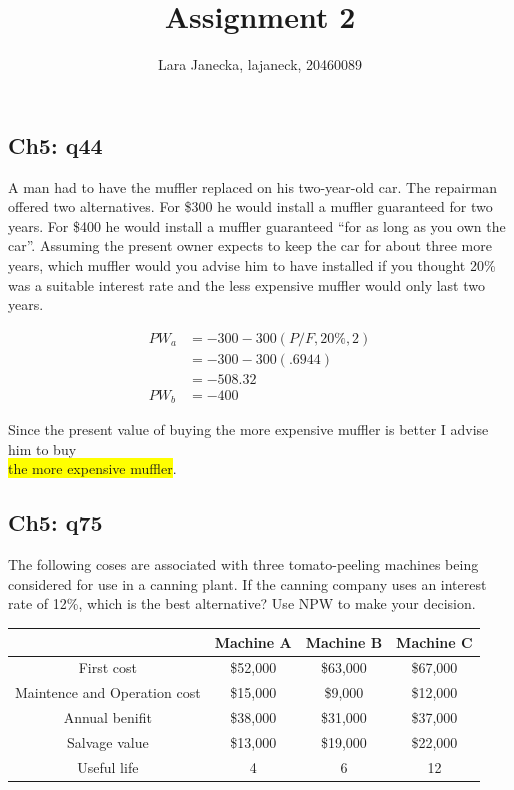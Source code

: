 \documentclass[12pt]{article}
\newcommand{\hilight}[1]{\colorbox{yellow}{#1}}
\begin{document}
\title{Assignment 2}
\maketitle
\author{Lara Janecka, lajaneck, 20460089}
\subsection*{Ch5: q44}
A man had to have the muffler replaced on his two-year-old car. The repairman offered two alternatives. For \$300 he would install a muffler guaranteed for two years. For \$400 he would install a muffler guaranteed ``for as long as you own the car''. Assuming the present owner expects to keep the car for about three more years, which muffler would you advise him to have installed if you thought 20\% was a suitable interest rate and the less expensive muffler would only last two years.

\begin{align*}
    PW_a &= -300 - 300(P/F, 20\%, 2)\\
         &= -300 - 300(.6944)\\
         &= -508.32\\
    PW_b &= -400
\end{align*}

Since the present value of buying the more expensive muffler is better I advise him to buy \\\hilight{the more expensive muffler}.

\subsection*{Ch5: q75}
The following coses are associated with three tomato-peeling machines being considered for use in a canning plant. If the canning company uses an interest rate of 12\%, which is the best alternative? Use NPW to make your decision.\\
\begin{center}
\begin{tabular} {| c | c c c|}
\hline
 & \textbf{Machine A} & \textbf{Machine B} & \textbf{Machine C}\\
\hline
First cost & \$52,000 & \$63,000 & \$67,000\\
Maintence and Operation cost & \$15,000 & \$9,000 & \$12,000\\
Annual benifit & \$38,000 & \$31,000 & \$37,000\\
Salvage value & \$13,000 & \$19,000 & \$22,000\\
Useful life & 4 & 6 & 12\\
\hline
\end{tabular}
\end{center}
\end{document}
